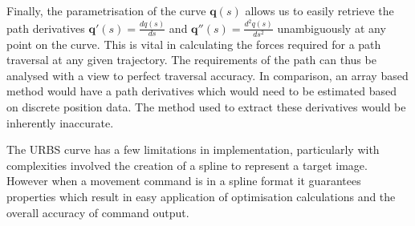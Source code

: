 Finally, the parametrisation of the curve $\textbf{q}(s)$ allows us to easily retrieve the path derivatives $\textbf{q}'(s) = \frac{dq(s)}{ds}$ and $\textbf{q}''(s) =  \frac{d^2q(s)}{ds^2}$ unambiguously at any point on the curve. This is vital in calculating the forces required for a path traversal at any given trajectory. The requirements of the path can thus be analysed with a view to perfect traversal accuracy. In comparison, an array based method would have a path derivatives which would need to be estimated based on discrete position data. The method used to extract these derivatives would be inherently inaccurate.

The URBS curve has a few limitations in implementation, particularly with complexities involved the creation of a spline to represent a target image. However when a movement command is in a spline format it guarantees properties which result in easy application of optimisation calculations and the overall accuracy of command output.
